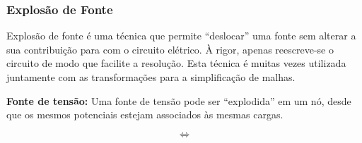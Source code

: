 \documentclass{article}
\numberwithin{equation}{section}
\newlength\Colsep
\begin{document}
\subsubsection{Explosão de Fonte}
\label{subsubsec:explosion}
Explosão de fonte é uma técnica que permite ``deslocar'' uma fonte sem alterar a sua contribuição para com o circuito elétrico. À rigor, apenas reescreve-se o circuito de modo que facilite a resolução. Esta técnica é muitas vezes utilizada juntamente com as transformações para a simplificação de malhas.

\textbf{Fonte de tensão:} Uma fonte de tensão pode ser ``explodida'' em um nó, desde que os mesmos potenciais estejam associados às mesmas cargas.

\begin{center}
\noindent\begin{minipage}{0.8\textwidth}
\begin{minipage}[c][4cm][c]{\dimexpr0.45\textwidth-0.5\Colsep\relax}
    \begin{center}
    \end{center}
\end{minipage} \hfill
\begin{minipage}[c][4cm][c]{\dimexpr0.1\textwidth-0.5\Colsep\relax}
    $$\iff$$
\end{minipage} \hfill
\begin{minipage}[c][4cm][c]{\dimexpr0.45\textwidth-0.5\Colsep\relax}
    \begin{center}
    \end{center}
\end{minipage}
\end{minipage}
\end{center}
\end{document}
